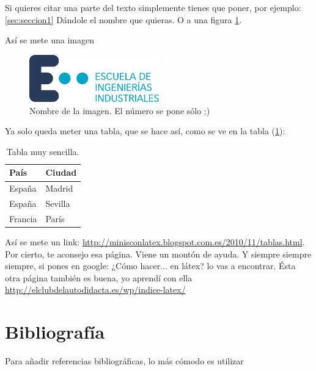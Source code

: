 \documentclass{article}
\begin{document}
Si quieres citar una parte del texto simplemente tienes que poner, por ejemplo: \ref{sec:seccion1} Dándole el nombre que quieras. O a una figura \ref{fig:nombre para referenciar la imagen}.


\newpage
Así se mete una imagen
\begin{figure}[hbtp]
    \centering
	\includegraphics[width = 0.5\textwidth]{Images/logo_eii.pdf}
    \caption{Nombre de la imagen. El número se pone sólo ;)}
    \label{fig:nombre para referenciar la imagen}
\end{figure}


Ya solo queda meter una tabla, que se hace así, como se ve en la tabla (\ref{tabla:sencilla}):

\begin{table}[htbp]
\begin{center}
\begin{tabular}{|l|l|}
\hline
País & Ciudad \\
\hline \hline
España & Madrid \\ \hline
España & Sevilla \\ \hline
Francia & París \\ \hline
\end{tabular}
\caption{Tabla muy sencilla.}
\label{tabla:sencilla}
\end{center}
\end{table}

Así se mete un link: \url{http://minisconlatex.blogspot.com.es/2010/11/tablas.html}. Por cierto, te aconsejo esa página. Viene un montón de ayuda. Y siempre siempre siempre, si pones en google: ¿Cómo hacer... en látex? lo vas a encontrar. Ésta otra página también es buena, yo aprendí con ella \url{http://elclubdelautodidacta.es/wp/indice-latex/}


\newpage

\section{Bibliografía}

Para añadir referencias bibliográficas, lo más cómodo es utilizar 
\end{document}
